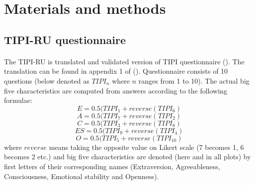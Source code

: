 \documentclass{llncs}
\begin{document}
\section{Materials and methods}\label{sec:MatMeth}

\subsection{TIPI-RU questionnaire}
\paragraph{}
The TIPI-RU is translated and validated version of TIPI questionnaire (\cite{Gos03}). The translation can be found in appendix 1 of (\cite{sergeeva2016translation}). Questionnaire consists of 10 questions (below denoted as $TIPI_n$ where $n$ ranges from 1 to 10). The actual big five characteristics are computed from answers according to the following formulae:
\begin{equation}
	\label{tipi-e}
	E = 0.5 (TIPI_1 + reverse(TIPI_6) 
\end{equation}
\begin{equation}
	A = 0.5 (TIPI_7 + reverse(TIPI_2) 
\end{equation}
\begin{equation}
	C = 0.5 (TIPI_3 + reverse(TIPI_8) 
\end{equation}
\begin{equation}
	ES = 0.5 (TIPI_9 + reverse(TIPI_4) 
\end{equation}
\begin{equation}
	\label{tipi-o}
	O = 0.5 (TIPI_5 + reverse(TIPI_{10}) 
\end{equation}
where $reverse$ means taking the opposite value on Likert scale (7 becomes 1, 6 becomes 2 etc.) and big five characteristics are denoted (here and in all plots) by first letters of their corresponding names (Extraversion, Agreeableness, Consciousness, Emotional stability and Openness).
\end{document}
